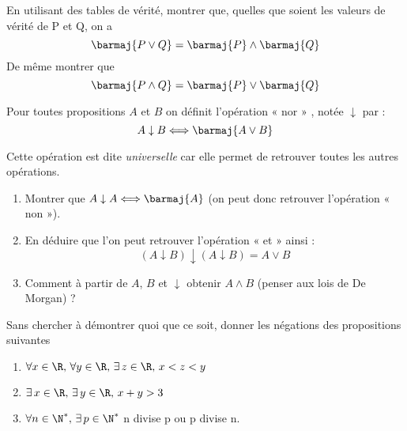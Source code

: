 \begin{exercice}
	En utilisant des tables de vérité, montrer que, quelles que soient les valeurs de vérité de P et Q, on a $$\barmaj{P\vee Q}=\barmaj{P}\wedge\barmaj{Q}$$
	De même  montrer que $$\barmaj{P\wedge Q}=\barmaj{P}\vee\barmaj{Q}$$
\end{exercice}
\begin{exercice}
	
	Pour toutes propositions $A$ et $B$ on définit l'opération  «  nor » , notée $\downarrow$ par : $$A\downarrow B \Longleftrightarrow\barmaj{A\vee B}$$
	
	Cette opération est dite \textit{universelle} car elle permet de retrouver toutes les autres opérations.
	
	\begin{enumerate}
		\item 	Montrer que $A\downarrow A \Longleftrightarrow \barmaj{A}$ (on peut donc retrouver l'opération « non »).
		\item 	En déduire que l'on peut retrouver l'opération « et » ainsi : $$(A\downarrow B)\downarrow(A\downarrow B) = A\vee B$$
		\item 	Comment à partir de $A$, $B$ et $\downarrow$ obtenir $A\wedge B$ (penser aux lois de De Morgan) ?
	\end{enumerate}
\end{exercice}

\begin{exercice}

	Sans chercher à démontrer quoi que ce soit, donner les négations des propositions suivantes
	
	\begin{enumerate}
		\item 	$\forall x\in \R,\, \forall y\in\R,\, \exists\, z\in \R,\, x<z<y$
		\item 	$\exists\, x\in \R,\, \exists\, y\in\R,\, x+y>3$
		\item 	$\forall n\in \N^*,\, \exists\, p\in\N^*$ n divise p ou p divise n.
	\end{enumerate}
	
\end{exercice}

